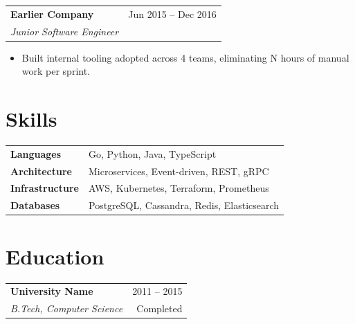\documentclass[10pt, a4paper]{article}
\makeatletter
\newcommand{\workentry}[4]{%
  \noindent
  \begin{tabularx}{\linewidth}{@{}X r@{}}
    \textbf{#1} & \textcolor{subtle}{\small #3} \\
    \textit{\small #2} &
  \end{tabularx}
  \vspace{1pt}
  #4
  \vspace{8pt}
}
\newcommand{\eduentry}[4]{%
  \noindent
  \begin{tabularx}{\linewidth}{@{}X r@{}}
    \textbf{#1} & \textcolor{subtle}{\small #4} \\
    \textit{\small #2} & \textcolor{subtle}{\small #3}
  \end{tabularx}
  \vspace{4pt}
}
\makeatother
\begin{document}
\workentry{Earlier Company}{Junior Software Engineer}{Jun 2015 -- Dec 2016}{%
  \begin{itemize}
    \item Built internal tooling adopted across 4 teams, eliminating N hours of manual work per sprint.
  \end{itemize}
}

\section{Skills}
\noindent
\begin{tabularx}{\linewidth}{@{} l X @{}}
  \textbf{Languages}      & Go, Python, Java, TypeScript \\[2pt]
  \textbf{Architecture}   & Microservices, Event-driven, REST, gRPC \\[2pt]
  \textbf{Infrastructure} & AWS, Kubernetes, Terraform, Prometheus \\[2pt]
  \textbf{Databases}      & PostgreSQL, Cassandra, Redis, Elasticsearch \\
\end{tabularx}

\section{Education}
\eduentry{University Name}{B.Tech, Computer Science}{Completed}{2011 -- 2015}


\end{document}
